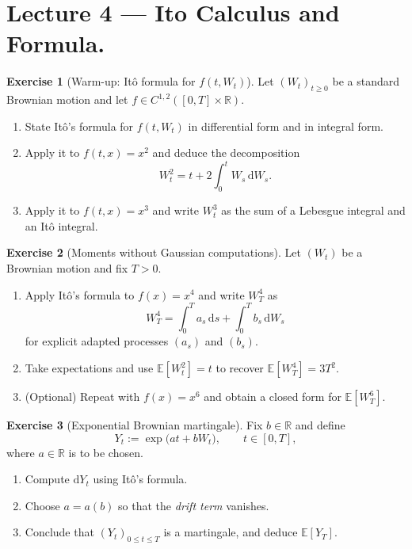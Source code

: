 \documentclass[11pt]{article}
\newcommand{\E}{\mathbb{E}}
\newcommand{\R}{\mathbb{R}}
\newcommand{\1}{\mathbf{1}}
\theoremstyle{definition}
\newtheorem{exercise}{Exercise}[section]
\begin{document}
\section{Lecture 4 --- Ito Calculus and Formula.}

\begin{exercise}[Warm-up: It\^o formula for $f(t,W_t)$]
Let $(W_t)_{t\ge 0}$ be a standard Brownian motion and let $f\in C^{1,2}([0,T]\times\R)$.
\begin{enumerate}[label=\textbf{(\alph*)}, itemsep=0.25em]
  \item State It\^o's formula for $f(t,W_t)$ in differential form and in integral form.
  \item Apply it to $f(t,x)=x^2$ and deduce the decomposition
  $$
    W_t^2 = t + 2\int_0^t W_s\,\mathrm{d} W_s.
  $$
  \item Apply it to $f(t,x)=x^3$ and write $W_t^3$ as the sum of a Lebesgue integral and an It\^o integral.
\end{enumerate}
\end{exercise}

\begin{exercise}[Moments without Gaussian computations]
Let $(W_t)$ be a Brownian motion and fix $T>0$.
\begin{enumerate}[label=\textbf{(\alph*)}, itemsep=0.25em]
  \item Apply It\^o's formula to $f(x)=x^4$ and write $W_T^4$ as
  $$
    W_T^4 = \int_0^T a_s\,\mathrm{d} s + \int_0^T b_s\,\mathrm{d} W_s
  $$
  for explicit adapted processes $(a_s)$ and $(b_s)$.
  \item Take expectations and use $\E[W_t^2]=t$ to recover $\E[W_T^4]=3T^2$.
  \item (Optional) Repeat with $f(x)=x^6$ and obtain a closed form for $\E[W_T^6]$.
\end{enumerate}
\end{exercise}


\begin{exercise}[Exponential Brownian martingale]
Fix $b\in\R$ and define
$$
Y_t := \exp\!\big(a t + b W_t\big), \qquad t\in[0,T],
$$
where $a\in\R$ is to be chosen.
\begin{enumerate}[label=\textbf{(\alph*)}, itemsep=0.25em]
  \item Compute $\mathrm{d} Y_t$ using It\^o's formula.
  \item Choose $a=a(b)$ so that the \emph{drift term} vanishes.
  \item Conclude that $(Y_t)_{0\le t\le T}$ is a martingale, and deduce $\E[Y_T]$.
\end{enumerate}
\end{exercise}
\end{document}
